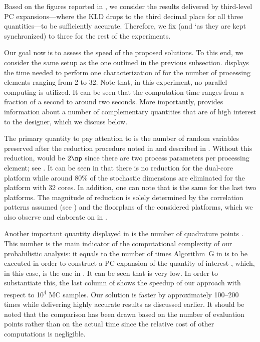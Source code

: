 Based on the figures reported in , we consider
the results delivered by third-level \ac{PC} expansions---where the \ac{KLD}
drops to the third decimal place for all three quantities---to be sufficiently
accurate. Therefore, we fix \lc (and \lq as they are kept synchronized) to three
for the rest of the experiments.


Our goal now is to assess the speed of the proposed solutions. To this end, we
consider the same setup as the one outlined in the previous subsection.
 displays the time needed to perform one
characterization of \vg for the number of processing elements \np ranging from 2
to 32. Note that, in this experiment, no parallel computing is utilized. It can
be seen that the computation time ranges from a fraction of a second to around
two seconds. More importantly,  provides
information about a number of complementary quantities that are of high interest
to the designer, which we discuss below.

The primary quantity to pay attention to is the number of random variables \nz
preserved after the reduction procedure noted in  and
described in . Without this reduction, \nz
would be $2 \np$ since there are two process parameters per processing element;
see . It can be seen in
 that there is no reduction for the dual-core
platform while around 80\% of the stochastic dimensions are eliminated for the
platform with 32 cores. In addition, one can note that \nz is the same for the
last two platforms. The magnitude of reduction is solely determined by the
correlation patterns assumed (see ) and the
floorplans of the considered platforms, which we also observe and elaborate on
in .

Another important quantity displayed in  is the
number of quadrature points \nq. This number is the main indicator of the
computational complexity of our probabilistic analysis: it equals to the number
of times Algorithm~G in  is to be executed in order to
construct a \ac{PC} expansion of the quantity of interest \g, which, in this
case, is the one in . It can be seen that \nq
is very low. In order to substantiate this, the last column of
 shows the speedup of our approach with respect
to 10\textsuperscript{4} \ac{MC} samples. Our solution is faster by
approximately 100--200 times while delivering highly accurate results as
discussed earlier. It should be noted that the comparison has been drawn based
on the number of evaluation points rather than on the actual time since the
relative cost of other computations is negligible.

